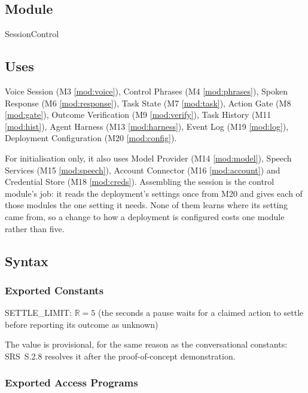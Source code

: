 \documentclass[12pt, titlepage]{article}
\newcommand{\R}{\mathbb{R}}
\begin{document}
\subsection{Module}

SessionControl

\subsection{Uses}

Voice Session (M3 \ref{mod:voice}), Control Phrases (M4 \ref{mod:phrases}),
Spoken Response (M6 \ref{mod:response}), Task State (M7 \ref{mod:task}), Action
Gate (M8 \ref{mod:gate}), Outcome Verification (M9 \ref{mod:verify}), Task
History (M11 \ref{mod:hist}), Agent Harness (M13 \ref{mod:harness}), Event Log
(M19 \ref{mod:log}), Deployment Configuration (M20 \ref{mod:config}).

\noindent For initialisation only, it also uses Model Provider (M14
\ref{mod:model}), Speech Services (M15 \ref{mod:speech}), Account Connector (M16
\ref{mod:account}) and Credential Store (M18 \ref{mod:creds}). Assembling the
session is the control module's job: it reads the deployment's settings once from
M20 and gives each of those modules the one setting it needs. None of them learns
where its setting came from, so a change to how a deployment is configured costs
one module rather than five.

\subsection{Syntax}

\subsubsection{Exported Constants}

SETTLE\_LIMIT: $\R = 5$ (the seconds a pause waits for a claimed action to
settle before reporting its outcome as unknown)

\noindent The value is provisional, for the same reason as the conversational
constants: SRS~S.2.8 resolves it after the proof-of-concept demonstration.

\subsubsection{Exported Access Programs}
\end{document}
